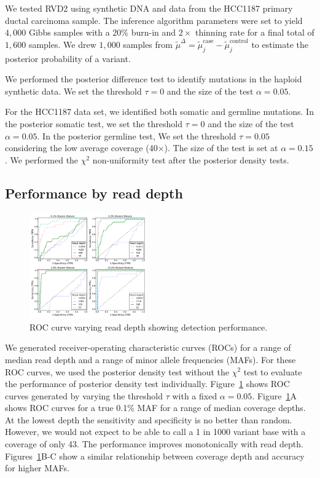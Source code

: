 \documentclass{bioinfo}
\begin{document}
We tested RVD2 using synthetic DNA and data from the HCC1187 primary ductal carcinoma sample. The inference algorithm parameters were set to yield $4,000$ Gibbs samples with a 20\% burn-in and $2\times$ thinning rate for a final total of $1,600$ samples. We drew $1,000$ samples from $ \tilde{\mu}^{\Delta} =  \tilde{\mu}_j^{\text{case}} - \tilde{\mu}_j^{\text{control}}$ to estimate the posterior probability of a variant.

We performed the posterior difference test to identify mutations in the haploid synthetic data. We set the threshold $ \tau =0 $ and the size of the test $ \alpha = 0.05$.

For the HCC1187 data set, we identified both somatic and germline mutations. In the posterior somatic test, we set the threshold $ \tau =0 $ and the size of the test $ \alpha = 0.05$. In the posterior germline test, We set  the threshold $ \tau =0.05 $ considering the low average coverage (40$\times$). The size of the test is set at $ \alpha = 0.15$. We performed the $\chi^2$ non-uniformity test after the posterior density tests.

\subsection{Performance by read depth}\label{sec:read_depth}

\begin{figure}[htbp]
\centering
\vspace{-15pt}
\includegraphics[width=0.45\textwidth]{pdf_figs/ROC_without_chi2.pdf}
\caption{ROC curve varying read depth showing detection performance. }
\vspace{-15pt}
\label{fig:ROC}
\end{figure}
We generated receiver-operating characteristic curves (ROCs) for a range of median read depth and a range of minor allele frequencies (MAFs). 
For these ROC curves, we used the posterior density test without the $\chi^2$ test to evaluate the performance of posterior density test individually. 
Figure~\ref{fig:ROC} shows ROC curves generated by varying the threshold $\tau$ with a fixed $\alpha=0.05$. 
Figure~\ref{fig:ROC}A shows ROC curves for a true 0.1\% MAF for a range of median coverage depths. 
At the lowest depth the sensitivity and specificity is no better than random. 
However, we would not expect to be able to call a 1 in 1000 variant base with a coverage of only 43. 
The performance improves monotonically with read depth. 
Figures~\ref{fig:ROC}B-C show a similar relationship between coverage depth and accuracy for higher MAFs.
\end{document}
